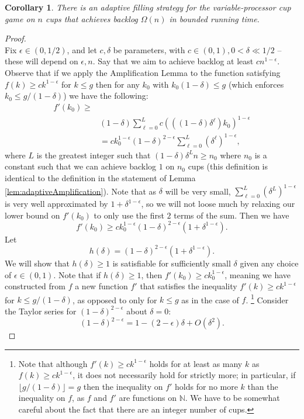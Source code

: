 \documentclass[twocolumn]{article}[10pt]
\newtheorem{corollary}{Corollary}
\begin{document}
\begin{corollary}
  \label{cor:adaptivePoly}
  There is an adaptive filling strategy for the variable-processor cup game on
  $n$ cups that achieves backlog $\Omega(n)$ in bounded running time.
\end{corollary}
\begin{proof}$ $\\
  Fix $\epsilon \in (0,1/2)$, and let $c, \delta$ be parameters, with $c\in
  (0,1), 0 < \delta \ll 1/2$ -- these will depend on $\epsilon, n$.
  Say that we aim to achieve backlog at least $cn^{1-\epsilon}$.
  Observe that if we apply the Amplification Lemma to the function satisfying
  $f(k) \ge ck^{1-\epsilon}$ for $k \le g$ then for any $k_0$ with
  $k_0(1-\delta)\le g$ (which enforces $k_0 \le g/ (1-\delta)$) we have the
  following:
  \begin{align*}
  f'(k_0)\ge&\\
  &(1-\delta)\sum_{\ell=0}^L c (((1-\delta)\delta^\ell)k_0)^{1-\epsilon}\\
  &= ck_0^{1-\epsilon} (1-\delta)^{2-\epsilon} \sum_{\ell=0}^L (\delta^\ell)^{1-\epsilon},
  \end{align*}
  where $L$ is the greatest integer such that $(1-\delta)\delta^Ln \ge n_0$
  where $n_0$ is a constant such that we can achieve backlog $1$ on $n_0$ cups
  (this definition is identical to the definition in the statement of Lemma
  \ref{lem:adaptiveAmplification}).
  Note that as $\delta$ will be very small, $\sum_{\ell=0}^L
  (\delta^L)^{1-\epsilon}$ is very well approximated by
  $1+\delta^{1-\epsilon}$, so we will not loose much by relaxing our lower
  bound on $f'(k_0)$ to only use the first $2$ terms of the sum. Then we have 
  $$f'(k_0) \ge ck_0^{1-\epsilon}(1-\delta)^{2-\epsilon}(1+\delta^{1-\epsilon}).$$
  Let 
  $$h(\delta) = (1-\delta)^{2-\epsilon}(1+\delta^{1-\epsilon}).$$
  We will show that $h(\delta) \ge 1$ is satisfiable for sufficiently small $\delta$ given any choice of $\epsilon \in (0,1)$.
  Note that if $h(\delta)\ge 1$, then $f'(k_0) \ge c
  k_0^{1-\epsilon}$, meaning we have constructed from $f$ a new function $f'$ that satisfies the inequality
  $f'(k) \ge ck^{1-\epsilon}$ for $k\le g/(1-\delta)$, as opposed to only for
  $k \le g$ as in the case of $f$.
  \footnote{Note that although $f'(k) \ge ck^{1-\epsilon}$ holds for at least as many $k$
    as $f(k) \ge c k^{1-\epsilon}$, it does not necessarily hold for strictly
    more; in particular, if $\lfloor g/(1-\delta) \rfloor = g$ then the inequality on
    $f'$ holds for no more $k$ than the inequality on $f$, as $f$ and $f'$ are
    functions on $\mathbb{N}$. We have to be somewhat careful about the fact that
    there are an integer number of cups.
  }
  Consider the Taylor series for $(1-\delta)^{2-\epsilon}$ about $\delta = 0$:
  $$(1-\delta)^{2-\epsilon} = 1 - (2-\epsilon)\delta + O(\delta^2).$$
 

\end{proof}
\end{document}
